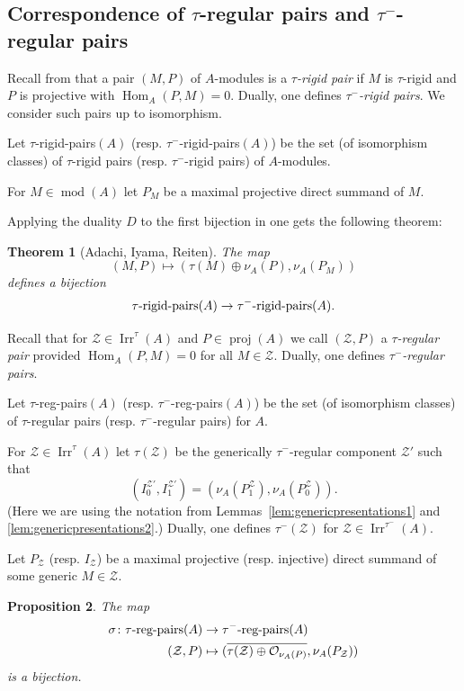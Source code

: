 \documentclass[12pt,reqno]{amsart}
\newtheorem{Thm}{Theorem}[section]
\newtheorem{Prop}[Thm]{Proposition}
\theoremstyle{definition}
\newcommand{\df}{\colon}
\newcommand{\cO}{{\mathcal O}}
\newcommand{\md}{\operatorname{mod}}
\newcommand{\proj}{\operatorname{proj}}
\newcommand{\Hom}{\operatorname{Hom}}
\newcommand{\irr}{\operatorname{Irr}}
\newcommand{\calZ}{\mathcal{Z}}
\begin{document}
\subsection{Correspondence of $\tau$-regular pairs and
$\tau^-$-regular pairs}\label{subsec:bijectionpairs}

Recall from \cite{AIR14} that a pair $(M,P)$ of $A$-modules
is a
\emph{$\tau$-rigid pair} if $M$ is $\tau$-rigid and $P$ is projective
with $\Hom_A(P,M) = 0$.
Dually, one defines \emph{$\tau^-$-rigid pairs}.
We consider such pairs up to isomorphism.

Let $\tau$-rigid-pairs$(A)$ (resp. $\tau^-$-rigid-pairs$(A)$) be the
set (of isomorphism classes) of $\tau$-rigid pairs (resp. $\tau^-$-rigid pairs) of $A$-modules.

For $M \in \md(A)$ let $P_M$ be a maximal projective direct summand
of $M$.

Applying the duality $D$ to the first bijection in \cite[Theorem~2.14]{AIR14} one gets the following theorem:



\begin{Thm}[{Adachi, Iyama, Reiten}]
The map
$$
(M,P) \mapsto (\tau(M) \oplus \nu_A(P),\nu_A(P_M))
$$
defines a bijection
$$
\tau\text{\rm -rigid-pairs}(A) \to \tau^-\text{\rm -rigid-pairs}(A).
$$
\end{Thm}

Recall that for $\calZ \in \irr^\tau(A)$ and
$P \in \proj(A)$ we call $(\calZ,P)$ a \emph{$\tau$-regular pair}
provided $\Hom_A(P,M) = 0$ for all $M \in \calZ$.
Dually, one defines \emph{$\tau^-$-regular pairs}.

Let $\tau$-reg-pairs$(A)$ (resp. $\tau^-$-reg-pairs$(A)$) be the
set (of isomorphism classes) of $\tau$-regular pairs (resp. $\tau^-$-regular pairs) for $A$.

For $\calZ \in \irr^\tau(A)$
let $\tau(\calZ)$ be the generically $\tau^-$-regular component
$\calZ'$ such that
$$
(I_0^{\calZ'},I_1^{\calZ'}) = (\nu_A(P_1^{\calZ}),\nu_A(P_0^{\calZ})).
$$
(Here we are using the notation from Lemmas~\ref{lem:genericpresentations1} and \ref{lem:genericpresentations2}.)
Dually, one defines $\tau^-(\calZ)$ for $\calZ \in \irr^{\tau^-}(A)$.

Let  $P_{\calZ}$ (resp. $I_\calZ$) be a maximal projective (resp. injective) direct summand of
some generic $M \in \calZ$.


\begin{Prop}\label{prop:correspondence}
The map
\begin{align*}
\sigma\df \tau\text{\rm-reg-pairs}(A) &\to
\tau^-\text{\rm-reg-pairs}(A)
\\
(\calZ,P) &\mapsto (\overline{\tau(\calZ) \oplus \cO_{\nu_A(P)}},\nu_A(P_{\calZ}))
\end{align*}
is a bijection.
\end{Prop}
\end{document}
